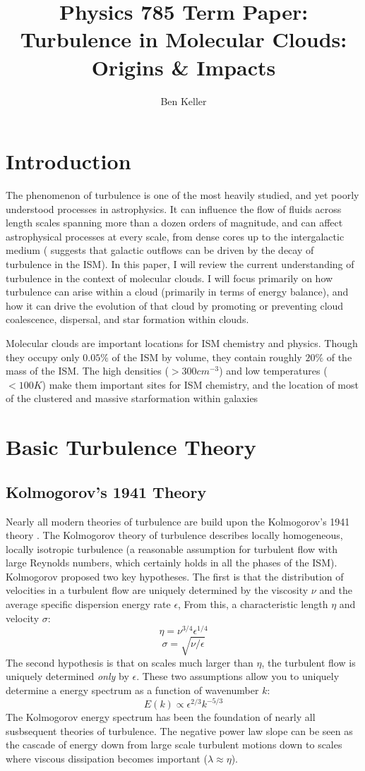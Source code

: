 \documentclass[12pt, preprint]{aastex}
\begin{document}
\title{Physics 785 Term Paper: Turbulence in Molecular Clouds: Origins \&
Impacts}
\author{Ben Keller}
\maketitle
\newpage
\section{Introduction}
The phenomenon of turbulence is one of the most heavily studied, and yet poorly
understood processes in astrophysics.  It can influence the flow of fluids across
length scales spanning more than a dozen orders of magnitude, and can affect
astrophysical processes at every scale, from dense cores \citep{larson1981} up to the intergalactic
medium (\citet{scan2013} suggests that galactic outflows can be
driven by the decay of turbulence in the ISM).  In this paper, I will review 
the current understanding of turbulence in the context of molecular clouds.  I
will focus primarily on how turbulence can arise within a cloud (primarily in terms of
energy balance), and how it can drive the evolution of that cloud by promoting
or preventing cloud coalescence, dispersal, and star formation within clouds.

Molecular clouds are important locations for ISM chemistry and physics.  Though
they occupy only $0.05\%$ of the ISM by volume, they contain roughly $20\%$ of
the mass of the ISM.  The high densities ($>300 cm^{-3}$) and low temperatures
($<100K$) make them important sites for ISM chemistry, and the location of most of
the clustered and massive starformation within galaxies\citep{tiel2010}

\section{Basic Turbulence Theory}
\subsection{Kolmogorov's 1941 Theory}
Nearly all modern theories of turbulence are build upon the Kolmogorov's 1941
theory \citep{kolm1991}.  The Kolmogorov theory of turbulence describes locally
homogeneous, locally isotropic turbulence (a reasonable assumption for turbulent
flow with large Reynolds numbers, which certainly holds in all the phases of the
ISM).  Kolmogorov proposed two key hypotheses. The first is that the distribution 
of velocities in a turbulent flow are uniquely determined by the viscosity 
$\nu$ and the average specific dispersion energy rate $\epsilon$,  From 
this, a characteristic length $\eta$ and velocity $\sigma$:
$$\eta = \nu^{3/4}\epsilon^{1/4}$$
$$\sigma = \sqrt{\nu/\epsilon}$$
The second hypothesis is that on scales much larger than $\eta$, the turbulent flow
is uniquely determined \textit{only} by $\epsilon$.  These two assumptions
allow you to uniquely determine a energy spectrum as a function of wavenumber
$k$:
$$E(k) \propto \epsilon^{2/3}k^{-5/3}$$
The Kolmogorov energy spectrum has been the foundation of nearly all susbsequent
theories of turbulence.  The negative power law slope can be seen as the cascade
of energy down from large scale turbulent motions down to scales where viscous
dissipation becomes important ($\lambda \approx \eta$).
\end{document}

